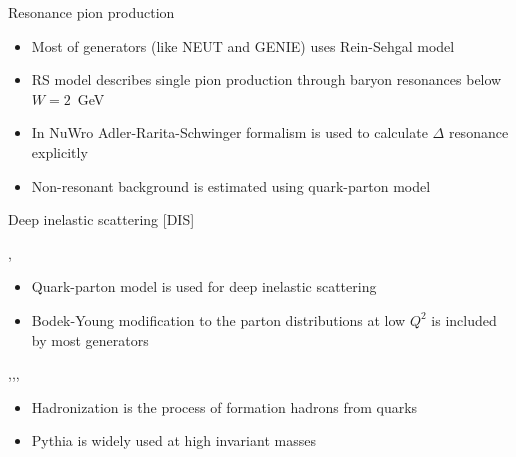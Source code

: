 
\begin{slide}[toc=RES pion production]{Resonance pion production}
\null\vfill

  \twocolumn
  {
    \begin{itemize}
      \item Most of generators (like NEUT and GENIE) uses Rein-Sehgal model
      \item RS model describes single pion production through baryon resonances below $W = 2$~GeV
    \end{itemize}
  }
  {
    \centering\scalebox{0.75}{}
  }	

  \begin{itemize}
    \item In NuWro Adler-Rarita-Schwinger formalism is used to calculate $\Delta$ resonance explicitly
    \item Non-resonant background is estimated using quark-parton model
  \end{itemize}

\vfill\null
\end{slide}


\begin{slide}[toc=Deep Inelastic Scattering]{Deep inelastic scattering [DIS]}
\null\vfill

  \twocolumn
  {
    \sep
    \begin{itemize}
     \item Quark-parton model is used for deep inelastic scattering
     \item Bodek-Young modification to the parton distributions at low $Q^2$ is included by most generators
    \end{itemize}
  }
  {
    \scalebox{0.75}{}
  }
  
  
  \twocolumn
  {
    \sep\sep\sep
    \centering\scalebox{0.75}{}
  }
  {
    \begin{itemize}
     \item Hadronization is the process of formation hadrons from quarks
     \item Pythia is widely used at high invariant masses
    \end{itemize}
  }

\vfill\null
\end{slide}

